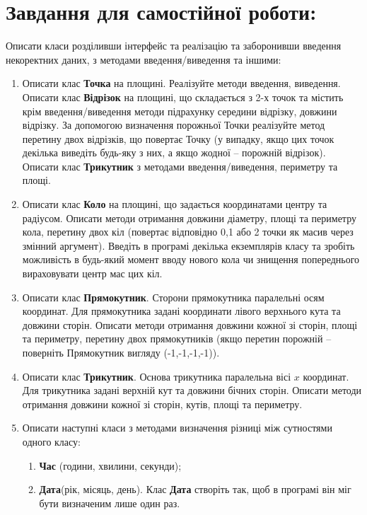 \documentclass[a5paper,titlepage,openany,twoside,
]
{book_unv}%
\makeatletter
\newcommand{\xslalph}[1]{\expandafter\@xslalph\csname c@#1\endcsname}
\newcommand{\@xslalph}[1]{%
    \ifcase#1\or а\or б\or в\or г\or д\or e\or є\or ж\or з\or i%
    \or й\or к\or л\or м\or н\or о\or п\or р\or с\or т%
    \or у\or ф\or х\or ц\or ч\or ш\or ю\or я\or аа\or бб\or вв%
    \else\@ctrerr\fi%
}
\makeatother
\begin{document}
\section{Завдання для самостійної роботи:}

Описати класи розділивши інтерфейс та реалізацію та заборонивши введення
некоректних даних, з методами введення/виведення та іншими:

\begin{enumerate}
\def\labelenumi{\arabic{enumi})}
\setcounter{enumi}{3}
\item
  Описати клас \textbf{Точка} на площині. Реалізуйте методи введення,
  виведення. Описати клас \textbf{Відрізок} на площині, що складається
  з 2-х точок та містить крім введення/виведення методи підрахунку
  середини відрізку, довжини відрізку. За допомогою визначення
  порожньої Точки реалізуйте метод перетину двох відрізків, що повертає
  Точку (у випадку, якщо цих точок декілька виведіть будь-яку з них, а
  якщо жодної -- порожній відрізок). Описати клас \textbf{Трикутник} з 
  методами введення/виведення, периметру та площі.
 
\item
  Описати клас \textbf{Коло} на площині, що задається координатами
  центру та радіусом. Описати методи отримання довжини діаметру, площі
  та периметру кола, перетину двох кіл (повертає відповідно 0,1 або 2
  точки як масив через змінний аргумент). Введіть в програмі декілька
екземплярів класу та зробіть можливість в будь-який момент вводу нового кола
чи знищення попереднього вираховувати центр мас цих кіл.

\item
  Описати клас \textbf{Прямокутник}. Сторони прямокутника паралельні
  осям координат. Для прямокутника задані координати лівого верхнього
  кута та довжини сторін. Описати методи отримання довжини кожної зі
  сторін, площі та периметру, перетину двох прямокутників (якщо перетин
  порожній -- поверніть Прямокутник вигляду (-1,-1,-1,-1)).
\item
  Описати клас \textbf{Трикутник}. Основа трикутника паралельна вісі
  $x$ координат. Для трикутника задані верхній кут та довжини
  бічних сторін. Описати методи отримання довжини кожної зі сторін, кутів,
  площі та периметру.

\item
  Описати наступні класи з методами визначення різниці між сутностями
одного класу:
\begin{enumerate}[label=\xslalph*)]
\item \textbf{Час} (години, хвилини, секунди);
\item \textbf{Дата}(рік, місяць, день).
Клас \textbf{Дата} створіть так, щоб в програмі він міг бути визначеним лише один раз. 
\end{enumerate}


\end{enumerate}
\end{document}
